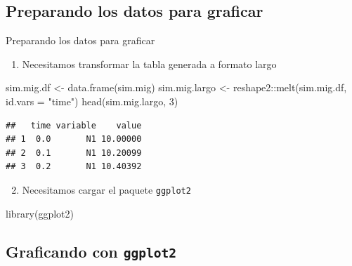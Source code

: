 \documentclass[
  11pt,
  ignorenonframetext,
]{beamer}
\newenvironment{Shaded}{}{}
\newcommand{\AttributeTok}[1]{\textcolor[rgb]{0.49,0.56,0.16}{#1}}
\newcommand{\DecValTok}[1]{\textcolor[rgb]{0.25,0.63,0.44}{#1}}
\newcommand{\FunctionTok}[1]{\textcolor[rgb]{0.02,0.16,0.49}{#1}}
\newcommand{\NormalTok}[1]{#1}
\newcommand{\OtherTok}[1]{\textcolor[rgb]{0.00,0.44,0.13}{#1}}
\newcommand{\SpecialCharTok}[1]{\textcolor[rgb]{0.25,0.44,0.63}{#1}}
\newcommand{\StringTok}[1]{\textcolor[rgb]{0.25,0.44,0.63}{#1}}
\providecommand{\tightlist}{%
  \setlength{\itemsep}{0pt}\setlength{\parskip}{0pt}}
\begin{document}
\hypertarget{preparando-los-datos-para-graficar}{%
\subsection{Preparando los datos para
graficar}\label{preparando-los-datos-para-graficar}}

\begin{frame}[fragile]{Preparando los datos para graficar}
\begin{enumerate}
\tightlist
\item
  Necesitamos transformar la tabla generada a formato largo
\end{enumerate}

\begin{Shaded}
\begin{Highlighting}[]
\NormalTok{sim.mig.df }\OtherTok{\textless{}{-}} \FunctionTok{data.frame}\NormalTok{(sim.mig)}
\NormalTok{sim.mig.largo }\OtherTok{\textless{}{-}}\NormalTok{ reshape2}\SpecialCharTok{::}\FunctionTok{melt}\NormalTok{(sim.mig.df, }\AttributeTok{id.vars =} \StringTok{"time"}\NormalTok{)}
\FunctionTok{head}\NormalTok{(sim.mig.largo, }\DecValTok{3}\NormalTok{)}
\end{Highlighting}
\end{Shaded}

\begin{verbatim}
##   time variable    value
## 1  0.0       N1 10.00000
## 2  0.1       N1 10.20099
## 3  0.2       N1 10.40392
\end{verbatim}

\begin{enumerate}
\setcounter{enumi}{1}
\tightlist
\item
  Necesitamos cargar el paquete \texttt{ggplot2}
\end{enumerate}

\begin{Shaded}
\begin{Highlighting}[]
\FunctionTok{library}\NormalTok{(ggplot2)}
\end{Highlighting}
\end{Shaded}
\end{frame}

\hypertarget{graficando-con-ggplot2}{%
\subsection{\texorpdfstring{Graficando con
\texttt{ggplot2}}{Graficando con ggplot2}}\label{graficando-con-ggplot2}}
\end{document}
